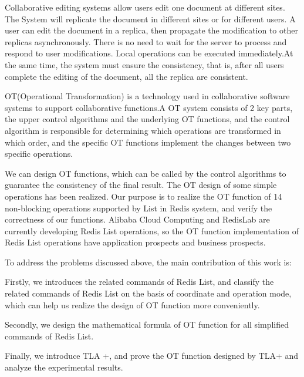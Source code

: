 \begin{englishabstract}
\par Collaborative editing systems allow users edit one document at different sites. The System will replicate the document in different sites or for different users. A user can edit the document in a replica, then propagate the modification to other replicas asynchronously. There is no need to wait for the server to process and respond to user modifications. Local operations can be executed immediately.At the same time, the system must ensure the consistency, that is, after all users complete the editing of the document, all the replica are consistent.
\par OT(Operational Transformation) is a technology used in collaborative software systems to support collaborative functions.A OT system consists of 2 key parts, the upper control algorithms and the underlying OT functions, and the control algorithm is responsible for determining which operations are transformed in which order, and the specific OT functions implement the changes between two specific operations.
\par We can design OT functions, which can be called by the control algorithms to guarantee the consistency of the final result. The OT design of some simple operations has been realized. Our purpose is to realize the OT function of 14 non-blocking operations supported by List in Redis system, and verify the correctness of our functions. Alibaba Cloud Computing and RedisLab are currently developing Redis List operations, so the OT function implementation of Redis List operations have application prospects and business prospects.
\par To address the problems discussed above, the main contribution of this work is:
\par Firstly, we introduces the related commands of Redis List, and classify the related commands of Redis List on the basis of coordinate and operation mode, which can help us realize the design of OT function more conveniently.
\par Secondly, we design the mathematical formula of OT function for all simplified commands of Redis List.
\par Finally, we introduce TLA +, and prove the OT function designed by TLA+ and analyze the experimental results.
\end{englishabstract}